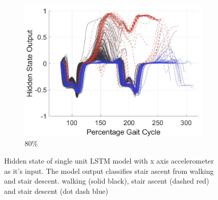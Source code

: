 \documentclass[sensors,article,submit,moreauthors,pdftex]{Definitions/mdpi}
\begin{document}
\begin{figure}[!hbt]
     \begin{subfigure}[b]{0.32\textwidth}
         \centering
         \includegraphics[width=\textwidth]{Figures/results/hidden_state/gyro_y_sa_v_w-sd/80_Participant_04.jpg}
         \caption{80\%}
         \label{subfig:gyro_y_w_v_sa_sd_80}
     \end{subfigure}
    \caption{Hidden state of single unit LSTM model with x axis accelerometer as it's input. The model output classifies stair ascent from walking and stair descent. walking (solid black), stair ascent (dashed red) and stair descent (dot dash blue)}
    \label{fig:hidden-state-gyro-y-w_v_sa-sd}
\end{figure}
\end{document}
